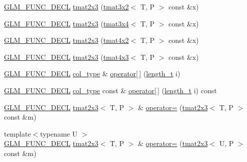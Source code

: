 \begin{DoxyCompactItemize}
\hyperlink{setup_8hpp_ab2d052de21a70539923e9bcbf6e83a51}{G\+L\+M\+\_\+\+F\+U\+N\+C\+\_\+\+D\+E\+CL} \hyperlink{structglm_1_1detail_1_1tmat2x3_acdd851e9160ca0515af9eef17a698d36}{tmat2x3} (\hyperlink{structglm_1_1detail_1_1tmat3x2}{tmat3x2}$<$ T, P $>$ const \&x)
\item 
\hyperlink{setup_8hpp_ab2d052de21a70539923e9bcbf6e83a51}{G\+L\+M\+\_\+\+F\+U\+N\+C\+\_\+\+D\+E\+CL} \hyperlink{structglm_1_1detail_1_1tmat2x3_a715213bd6e4ad7b7c4757590821b7ef2}{tmat2x3} (\hyperlink{structglm_1_1detail_1_1tmat3x4}{tmat3x4}$<$ T, P $>$ const \&x)
\item 
\hyperlink{setup_8hpp_ab2d052de21a70539923e9bcbf6e83a51}{G\+L\+M\+\_\+\+F\+U\+N\+C\+\_\+\+D\+E\+CL} \hyperlink{structglm_1_1detail_1_1tmat2x3_acc53a40969e8baec1323cbcd3db5021f}{tmat2x3} (\hyperlink{structglm_1_1detail_1_1tmat4x2}{tmat4x2}$<$ T, P $>$ const \&x)
\item 
\hyperlink{setup_8hpp_ab2d052de21a70539923e9bcbf6e83a51}{G\+L\+M\+\_\+\+F\+U\+N\+C\+\_\+\+D\+E\+CL} \hyperlink{structglm_1_1detail_1_1tmat2x3_a954965401031a46da66fcbb18536ead0}{tmat2x3} (\hyperlink{structglm_1_1detail_1_1tmat4x3}{tmat4x3}$<$ T, P $>$ const \&x)
\item 
\hyperlink{setup_8hpp_ab2d052de21a70539923e9bcbf6e83a51}{G\+L\+M\+\_\+\+F\+U\+N\+C\+\_\+\+D\+E\+CL} \hyperlink{structglm_1_1detail_1_1tmat2x3_aa68634b0c048f0010844a45aa5e9bdab}{col\+\_\+type} \& \hyperlink{structglm_1_1detail_1_1tmat2x3_a68883354758d90780a8f45ecdef13ef9}{operator\mbox{[}$\,$\mbox{]}} (\hyperlink{namespaceglm_a090a0de2260835bee80e71a702492ed9}{length\+\_\+t} i)
\item 
\hyperlink{setup_8hpp_ab2d052de21a70539923e9bcbf6e83a51}{G\+L\+M\+\_\+\+F\+U\+N\+C\+\_\+\+D\+E\+CL} \hyperlink{structglm_1_1detail_1_1tmat2x3_aa68634b0c048f0010844a45aa5e9bdab}{col\+\_\+type} const  \& \hyperlink{structglm_1_1detail_1_1tmat2x3_ae95f4927e7961322f81f5c1902b116db}{operator\mbox{[}$\,$\mbox{]}} (\hyperlink{namespaceglm_a090a0de2260835bee80e71a702492ed9}{length\+\_\+t} i) const
\item 
\hyperlink{setup_8hpp_ab2d052de21a70539923e9bcbf6e83a51}{G\+L\+M\+\_\+\+F\+U\+N\+C\+\_\+\+D\+E\+CL} \hyperlink{structglm_1_1detail_1_1tmat2x3}{tmat2x3}$<$ T, P $>$ \& \hyperlink{structglm_1_1detail_1_1tmat2x3_aa725ba154586ee1bfea787036c82bc4a}{operator=} (\hyperlink{structglm_1_1detail_1_1tmat2x3}{tmat2x3}$<$ T, P $>$ const \&m)
\item 
{\footnotesize template$<$typename U $>$ }\\\hyperlink{setup_8hpp_ab2d052de21a70539923e9bcbf6e83a51}{G\+L\+M\+\_\+\+F\+U\+N\+C\+\_\+\+D\+E\+CL} \hyperlink{structglm_1_1detail_1_1tmat2x3}{tmat2x3}$<$ T, P $>$ \& \hyperlink{structglm_1_1detail_1_1tmat2x3_a449f7c79e1c6333dbc508656a698b4d9}{operator=} (\hyperlink{structglm_1_1detail_1_1tmat2x3}{tmat2x3}$<$ U, P $>$ const \&m)

\end{DoxyCompactItemize}
